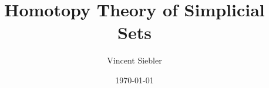 \documentclass{article}
\title{Homotopy Theory of Simplicial Sets}
\author{Vincent Siebler}
\date{\today}
\begin{document}
\maketitle

\begin{comment}




   



























\end{comment}


\begin{comment}







%
\end{comment}
\end{document}
